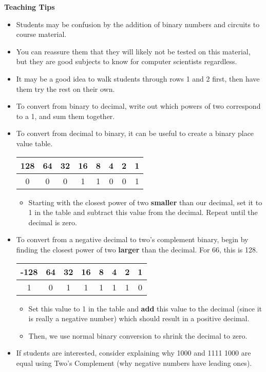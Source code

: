 \begin{blocksection}
\begin{guide}
\textbf{Teaching Tips}
\begin{itemize}
  \item Students may be confusion by the addition of binary numbers and circuits to course material.
  \item You can reassure them that they will likely not be tested on this material, but they are good subjects to know for computer scientists regardless.
  \item It may be a good idea to walk students through rows 1 and 2 first, then have them try the rest on their own.
  \item To convert from binary to decimal, write out which powers of two correspond to a 1, and sum them together.
  \item To convert from decimal to binary, it can be useful to create a binary place value table.
  \begin{center}
  \begin{tabular}{|c|c|c|c|c|c|c|c|}
    \hline
    128 & 64 & 32 & 16 & 8 & 4 & 2 & 1 \\
    \hline
    0 & 0 & 0 & 1 & 1 & 0 & 0 & 1 \\
    \hline
  \end{tabular}
  \end{center}
  \begin{itemize}
    \item Starting with the closest power of two \textbf{smaller} than our decimal, set it to 1 in the table and subtract this value from the decimal. Repeat until the decimal is zero.
  \end{itemize}
  \item To convert from a negative decimal to two's complement binary, begin by finding the closest power of two \textbf{larger} than the decimal. For 66, this is 128.
  \begin{center}
  \begin{tabular}{|c|c|c|c|c|c|c|c|}
    \hline
    -128 & 64 & 32 & 16 & 8 & 4 & 2 & 1 \\
    \hline
    1 & 0 & 1 & 1 & 1 & 1 & 1 & 0 \\
    \hline
  \end{tabular}
  \end{center}
  \begin{itemize}
    \item Set this value to 1 in the table and \textbf{add} this value to the decimal (since it is really a negative number) which should result in a positive decimal.
    \item Then, we use normal binary conversion to shrink the decimal to zero.
  \end{itemize}
  \item If students are interested, consider explaining why 1000 and 1111 1000 are equal using Two's Complement (why negative numbers have leading ones).
\end{itemize}
\end{guide}
\end{blocksection}
